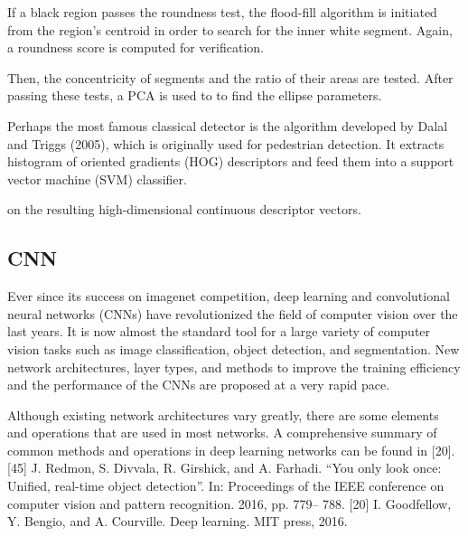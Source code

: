 \documentclass[a4paper]{report}
\begin{document}
If a black region passes the roundness test, the flood-fill algorithm is initiated from the region’s centroid in order to search for the inner white segment. Again, a roundness score is computed for verification.

Then, the concentricity of segments and the ratio of their areas are tested. After passing these tests, a PCA is used to to find the ellipse parameters.





Perhaps the most famous classical detector is the algorithm developed by Dalal
and Triggs (2005), which is originally used for pedestrian detection. It extracts histogram of oriented gradients (HOG) descriptors and feed them into a support vector machine (SVM) classifier.


on the resulting high-dimensional continuous descriptor vectors. 


\subsection{CNN}
Ever since its success on imagenet competition, deep learning and convolutional neural networks (CNNs) have revolutionized the field of computer vision over the last
years. It is now almost the standard tool for a large
variety of computer vision tasks such as image classification, object detection, and segmentation. 
New network architectures, layer types, and methods to improve the training efficiency and the performance of the CNNs are proposed at a very rapid pace.

Although existing network architectures vary greatly, there are some elements and operations that are used in most networks. 
A comprehensive summary of common methods and operations in deep learning networks can be found in [20].
[45] J. Redmon, S. Divvala, R. Girshick, and A. Farhadi. “You only look
once: Unified, real-time object detection”. In: Proceedings of the IEEE
conference on computer vision and pattern recognition. 2016, pp. 779–
788.
[20] I. Goodfellow, Y. Bengio, and A. Courville. Deep learning. MIT press,
2016.
\end{document}
